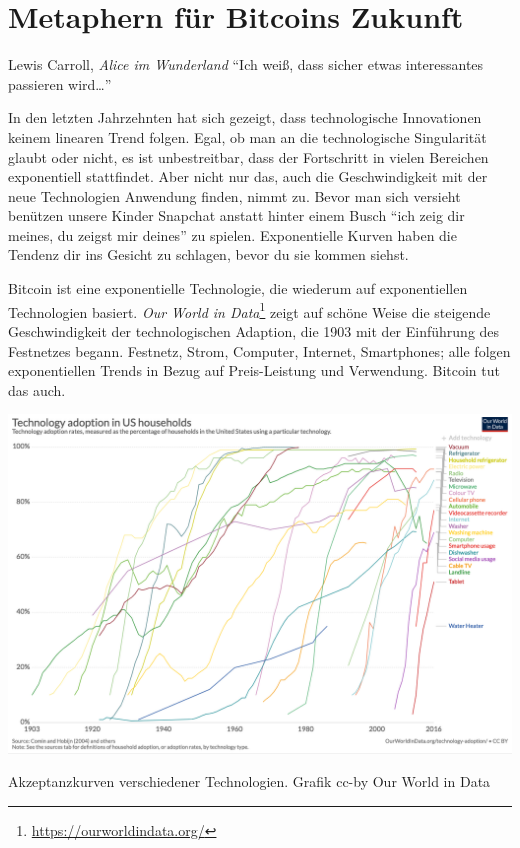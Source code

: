 \chapter{Metaphern für Bitcoins Zukunft}
\label{les:21}

\begin{chapquote}{Lewis Carroll, \textit{Alice im Wunderland}}
\enquote{Ich weiß, dass sicher etwas interessantes passieren wird\ldots}
\end{chapquote}

In den letzten Jahrzehnten hat sich gezeigt, dass technologische Innovationen
keinem linearen Trend folgen. Egal, ob man an die technologische Singularität
glaubt oder nicht, es ist unbestreitbar, dass der Fortschritt in vielen
Bereichen exponentiell stattfindet. Aber nicht nur das, auch die
Geschwindigkeit mit der neue Technologien Anwendung finden, nimmt zu. Bevor man
sich versieht benützen unsere Kinder Snapchat anstatt hinter einem Busch
\enquote{ich zeig dir meines, du zeigst mir deines} zu spielen. Exponentielle
Kurven haben die Tendenz dir ins Gesicht zu schlagen, bevor du sie kommen
siehst.

Bitcoin ist eine exponentielle Technologie, die wiederum auf exponentiellen
Technologien basiert. \textit{Our World in
Data}\footnote{\url{https://ourworldindata.org/}} zeigt auf schöne Weise die
steigende Geschwindigkeit der technologischen Adaption, die 1903 mit der
Einführung des Festnetzes begann. Festnetz, Strom, Computer, Internet,
Smartphones; alle folgen exponentiellen Trends in Bezug auf Preis-Leistung und
Verwendung. Bitcoin tut das auch.

\begin{center}
  \includegraphics[width=\textwidth]{assets/images/tech-adoption.png}
  \caption{Akzeptanzkurven verschiedener Technologien. Grafik cc-by Our World in Data}
  \label{fig:tech-adoption}
\end{center}


